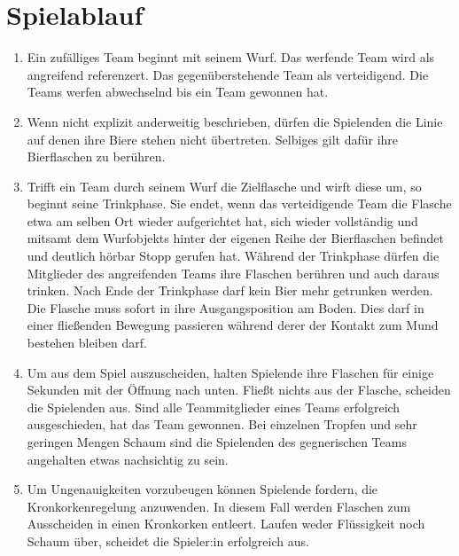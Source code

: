 \section{Spielablauf}
\begin{enumerate}[label={(\arabic*)}]    
    \item
    Ein zufälliges Team beginnt mit seinem Wurf.
    Das werfende Team wird als \glqq{}angreifend\grqq{} referenzert.
    Das gegenüberstehende Team als \glqq{}verteidigend\grqq{}.
    Die Teams werfen abwechselnd bis ein Team gewonnen hat.

    \item
    Wenn nicht explizit anderweitig beschrieben, dürfen die Spielenden die Linie auf denen ihre Biere stehen nicht übertreten.
    Selbiges gilt dafür ihre Bierflaschen zu berühren.

    \item
    Trifft ein Team durch seinem Wurf die Zielflasche und wirft diese um, so beginnt seine Trinkphase.
    Sie endet, wenn das verteidigende Team die Flasche etwa am selben Ort wieder aufgerichtet hat, sich wieder vollständig und mitsamt dem Wurfobjekts hinter der eigenen Reihe der Bierflaschen befindet und deutlich hörbar \glqq{}Stopp\grqq{} gerufen hat.
    Während der Trinkphase dürfen die Mitglieder des angreifenden Teams ihre Flaschen berühren und auch daraus trinken.
    Nach Ende der Trinkphase darf kein Bier mehr getrunken werden.
    Die Flasche muss sofort in ihre Ausgangsposition am Boden.
    Dies darf in einer fließenden Bewegung passieren während derer der Kontakt zum Mund bestehen bleiben darf.

    \item
    Um aus dem Spiel auszuscheiden, halten Spielende ihre Flaschen für einige Sekunden mit der Öffnung nach unten.
    Fließt nichts aus der Flasche, scheiden die Spielenden aus.
    Sind alle Teammitglieder eines Teams erfolgreich ausgeschieden, hat das Team gewonnen.
    Bei einzelnen Tropfen und sehr geringen Mengen Schaum sind die Spielenden des gegnerischen Teams angehalten etwas nachsichtig zu sein.

    \item
    Um Ungenauigkeiten vorzubeugen können Spielende fordern, die Kronkorkenregelung anzuwenden.
    In diesem Fall werden Flaschen zum Ausscheiden in einen Kronkorken entleert.
    Laufen weder Flüssigkeit noch Schaum über, scheidet die Spieler:in erfolgreich aus.
\end{enumerate}

